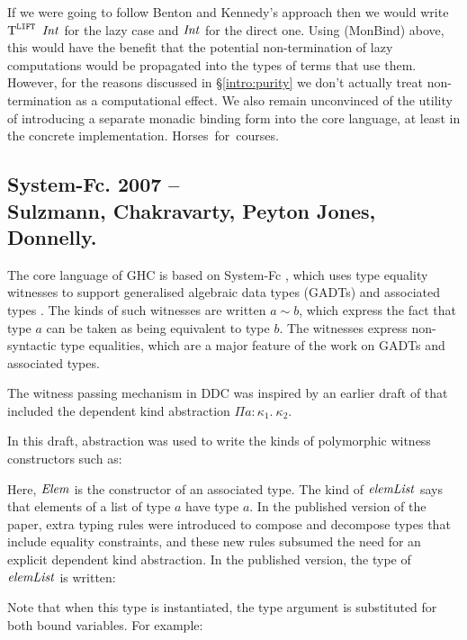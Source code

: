 If we were going to follow Benton and Kennedy's approach then we would write $\trm{T}^{\texttt{LIFT}} \ \iInt$ for the lazy case and $\operatorname{\mathit{Int}}$ for the direct one. Using (MonBind) above, this would have the benefit that the potential non-termination of lazy computations would be propagated into the types of terms that use them. However, for the reasons discussed in \S\ref{intro:purity} we don't actually treat non-termination as a computational effect. We also remain unconvinced of the utility of introducing a separate monadic binding form into the core language, at least in the concrete implementation. \mbox{Horses for courses.}


\subsection{System-Fc. 2007 -- \\
	Sulzmann, Chakravarty, Peyton Jones, Donnelly.}

The core language of GHC is based on System-Fc \cite{sulzmann:system-Fc}, which uses type equality witnesses to support generalised algebraic data types (GADTs) \cite{xi:grdc} and associated types \cite{chakravarty:associated-types}. The kinds of such witnesses are written $a \sim b$, which express the fact that type $a$ can be taken as being equivalent to type $b$. The witnesses express non-syntactic type equalities, which are a major feature of the work on GADTs and associated types.

 
The witness passing mechanism in DDC was inspired by an earlier draft of \cite{sulzmann:system-Fc} that included the dependent kind abstraction $\Pi a : \kappa_1 . \ \kappa_2$. 

\clearpage{}
In this draft, abstraction was used to write the kinds of polymorphic witness constructors such as:


Here, $\operatorname{\mathit{Elem}}$ is the constructor of an associated type. The kind of $\operatorname{\mathit{elemList}}$ says that elements of a list of type $a$ have type $a$. In the published version of the paper, extra typing rules were introduced to compose and decompose types that include equality constraints, and these new rules subsumed the need for an explicit dependent kind abstraction. In the published version, the type of $\operatorname{\mathit{elemList}}$ is written:


Note that when this type is instantiated, the type argument is substituted for both bound variables. For example:


